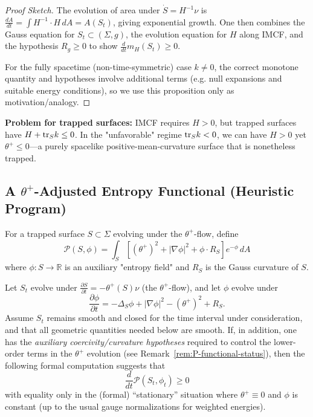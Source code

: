 \begin{proof}[Proof Sketch]
The evolution of area under $\dot{S} = H^{-1}\nu$ is $\frac{dA}{dt} = \int H^{-1} \cdot H \, dA = A(S_t)$, giving exponential growth. One then combines the Gauss equation for $S_t\subset (\Sigma,g)$, the evolution equation for $H$ along IMCF, and the hypothesis $R_g\ge 0$ to show $\frac{d}{dt}m_H(S_t)\ge 0$.

For the fully spacetime (non-time-symmetric) case $k\ne 0$, the correct monotone quantity and hypotheses involve additional terms (e.g. null expansions and suitable energy conditions), so we use this proposition only as motivation/analogy.
\end{proof}

\textbf{Problem for trapped surfaces:} IMCF requires $H > 0$, but trapped surfaces have $H + \mathrm{tr}_S k \leq 0$. In the "unfavorable" regime $\mathrm{tr}_S k < 0$, we can have $H > 0$ yet $\theta^+ \leq 0$---a purely spacelike positive-mean-curvature surface that is nonetheless trapped.

\subsection{A \texorpdfstring{$\theta^+$}{theta+}-Adjusted Entropy Functional (Heuristic Program)}

\begin{definition}
\label{def:spacetime-perelman}
For a trapped surface $S \subset \Sigma$ evolving under the $\theta^+$-flow, define
\begin{equation}
\mathcal{P}(S, \phi) = \int_S \left[(\theta^+)^2 + |\nabla\phi|^2 + \phi \cdot R_S\right]e^{-\phi} \, dA
\label{eq:penrose-entropy}
\end{equation}
where $\phi: S \to \mathbb{R}$ is an auxiliary "entropy field" and $R_S$ is the Gauss curvature of $S$.
\end{definition}

\begin{theorem}
\label{thm:spacetime-monotonicity}
Let $S_t$ evolve under $\frac{\partial S}{\partial t} = -\theta^+(S)\nu$ (the $\theta^+$-flow), and let $\phi$ evolve under
\begin{equation}
\frac{\partial \phi}{\partial t} = -\Delta_S \phi + |\nabla \phi|^2 - (\theta^+)^2 + R_S.
\label{eq:phi-evolution}
\end{equation}
Assume $S_t$ remains smooth and closed for the time interval under consideration, and that all geometric quantities needed below are smooth.
If, in addition, one has the \emph{auxiliary coercivity/curvature hypotheses} required to control the lower-order terms in the $\theta^+$ evolution (see Remark~\ref{rem:P-functional-status}), then the following formal computation suggests that
\begin{equation}
\frac{d}{dt}\mathcal{P}(S_t, \phi_t) \geq 0
\label{eq:P-monotone}
\end{equation}
with equality only in the (formal) ``stationary'' situation where $\theta^+ \equiv 0$ and $\phi$ is constant (up to the usual gauge normalizations for weighted energies).
\end{theorem}

